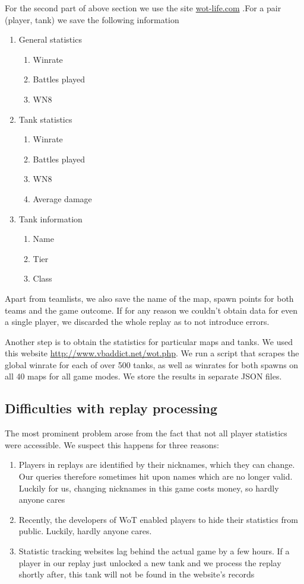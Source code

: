 \documentclass{report}
\begin{document}
For the second part of above section we use the site \url{wot-life.com} .For a pair (player, tank) we 
save the following information
\begin{enumerate}
	\item{ General statistics
		\begin{enumerate}
			\item Winrate
			\item Battles played
			\item WN8
		\end{enumerate}
	}
	\item{ Tank statistics
		\begin{enumerate}
			\item Winrate
			\item Battles played
			\item WN8
			\item Average damage
		\end{enumerate}
	}
	\item{ Tank information
		\begin{enumerate}
			\item Name
			\item Tier
			\item Class
		\end{enumerate}
	}
\end{enumerate}

Apart from teamlists, we also save the name of the map, spawn points for both teams and the game outcome. If for any reason we couldn't obtain data for even a single player, we discarded the whole replay as to not introduce errors.

Another step is to obtain the statistics for particular maps and tanks. We used this website 
\url{http://www.vbaddict.net/wot.php}. 
We run a script that scrapes the global winrate for each of over 500 tanks, as well as winrates for both spawns on all 40 maps for all game modes. 
We store the results in separate JSON files.

\subsection{Difficulties with replay processing}

The most prominent problem arose from the fact that not all player statistics were accessible. 
We suspect this happens for three reasons:
\begin{enumerate}
	\item{Players in replays are identified by their nicknames, which they can change. Our queries therefore sometimes hit upon names which are no longer valid. Luckily for us, changing nicknames in this game costs money, so hardly anyone cares}
	\item{Recently, the developers of WoT enabled players to hide their statistics from public. Luckily, hardly anyone cares.}
	\item{Statistic tracking websites lag behind the actual game by a few hours. If a player in our replay just unlocked a new tank and we process the replay shortly after, this tank will not be found in the website's records}
\end{enumerate}
\end{document}
